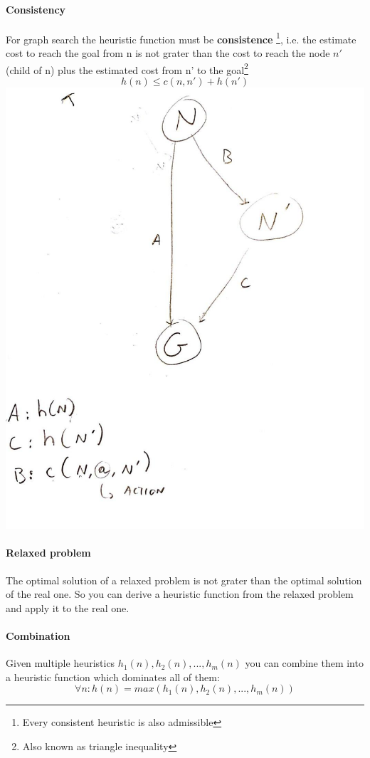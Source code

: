 \documentclass[10pt,a4paper]{article}
\begin{document}
\paragraph{Consistency}
For graph search the heuristic function must be \textbf{consistence} \footnote{Every consistent heuristic is also admissible}, i.e. the estimate cost to reach the goal from n is not grater than the cost to reach the node $n'$ (child of n) plus the estimated cost from n' to the goal\footnote{Also known as triangle inequality}
\[h(n) \le c(n,n')+h(n')\]
\includegraphics[scale=0.2]{images/consistency.jpg}


\paragraph{Relaxed problem}
The optimal solution of a relaxed problem is not grater than the optimal solution of the real one. So you can derive a heuristic function from the relaxed problem and apply it to the real one.

\paragraph{Combination}
Given multiple heuristics $h_1(n),h_2(n),...,h_m(n)$ you can combine them into a heuristic function which dominates all of them:
\[\forall n: h(n)=max(h_1(n),h_2(n),...,h_m(n))\]
\end{document}
